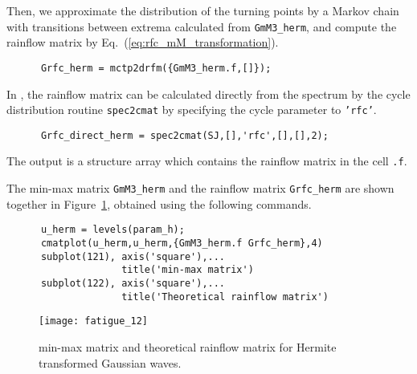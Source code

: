 Then, we approximate the distribution of the turning points by a
Markov chain with transitions between extrema calculated from
\verb+GmM3_herm+, and compute the rainflow matrix
by Eq.~(\ref{eq:rfc_mM_transformation}).
{\small\begin{verbatim}
      Grfc_herm = mctp2drfm({GmM3_herm.f,[]});
\end{verbatim}}
In \progname{}, the rainflow matrix can be calculated directly
from the spectrum by the cycle distribution routine {\tt spec2cmat} by
specifying the cycle parameter to {\tt 'rfc'}.
{\small\begin{verbatim}
      Grfc_direct_herm = spec2cmat(SJ,[],'rfc',[],[],2);
\end{verbatim}} 
\noindent
The output is a structure array which contains the rainflow matrix in the
cell {\tt .f}.

The min-max matrix \verb+GmM3_herm+ and the rainflow matrix
\verb+Grfc_herm+ are shown together in Figure~\ref{fig_wafo_6.5},
obtained using the following commands.
{\small\begin{verbatim}
      u_herm = levels(param_h);
      cmatplot(u_herm,u_herm,{GmM3_herm.f Grfc_herm},4)
      subplot(121), axis('square'),...
                    title('min-max matrix')
      subplot(122), axis('square'),...
                    title('Theoretical rainflow matrix')
\end{verbatim}}
\begin{figure}
  \centering
  \texttt{[image: fatigue\_12]}
\vspace{-3mm}
\caption[min-max and theoretical rainflow matrix for Hermite waves]
{min-max matrix and theoretical rainflow matrix for Hermite transformed
Gaussian waves.}
\label{fig_wafo_6.5}
\end{figure}


